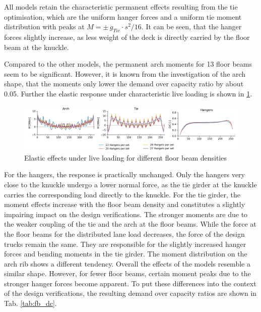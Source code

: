 All models retain the characteristic permanent effects resulting from the tie optimisation, which are the uniform hanger forces and a uniform tie moment distribution with peaks at $M=\pm\,g_{Tie} \cdot s^2 / 16$. It can be seen, that the hanger forces slightly increase, as less weight of the deck is directly carried by the floor beam at the knuckle.

Compared to the other models, the permanent arch moments for 13 floor beams seem to be significant. However, it is known from the investigation of the arch shape, that the moments only lower the demand over capacity ratio by about 0.05.
Further the elastic response under characteristic live loading is shown in \cref{fig:fb_live}. 

\begin{figure}[H]
    \centering
    \includegraphics[trim={0 0 1cm 0},clip, width=\textwidth]{calculations/hanger density/dead loading_plot.png}
    \caption{Elastic effects under live loading for different floor beam densities}
    \label{fig:fb_live}
\end{figure}

For the hangers, the response is practically unchanged. Only the hangers very close to the knuckle undergo a lower normal force, as the tie girder at the knuckle carries the corresponding load directly to the knuckle. For the tie girder, the moment effects increase with the floor beam density and constitutes a slightly impairing impact on the design verifications. The stronger moments are due to the weaker coupling of the tie and the arch at the floor beams. While the force at the floor beams for the distributed lane load decreases, the force of the design trucks remain the same. They are responsible for the slightly increased hanger forces and bending moments in the tie girder. The moment distribution on the arch rib shows a different tendency. Overall the effects of the models resemble a similar shape. However, for fewer floor beams, certain moment peaks due to the stronger hanger forces become apparent. To put these differences into the context of the design verifications, the resulting demand over capacity ratios are shown in Tab. \ref{tab:fb_dc}.



